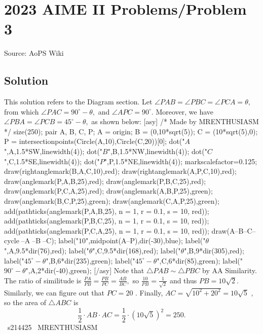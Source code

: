 \documentclass[12pt]{article}
\begin{document}
\section*{{2023 AIME II Problems/Problem 3}}
Source: AoPS Wiki

\subsection*{Solution}
This solution refers to the Diagram section. Let $\angle PAB = \angle PBC = \angle PCA = \theta,$ from which $\angle PAC = 90^\circ-\theta,$ and $\angle APC = 90^\circ.$ Moreover, we have $\angle PBA = \angle PCB = 45^\circ-\theta,$ as shown below: [asy] /* Made by MRENTHUSIASM */ size(250); pair A, B, C, P; A = origin; B = (0,10*sqrt(5)); C = (10*sqrt(5),0); P = intersectionpoints(Circle(A,10),Circle(C,20))[0]; dot("$A$",A,1.5*SW,linewidth(4)); dot("$B$",B,1.5*NW,linewidth(4)); dot("$C$",C,1.5*SE,linewidth(4)); dot("$P$",P,1.5*NE,linewidth(4)); markscalefactor=0.125; draw(rightanglemark(B,A,C,10),red); draw(rightanglemark(A,P,C,10),red); draw(anglemark(P,A,B,25),red); draw(anglemark(P,B,C,25),red); draw(anglemark(P,C,A,25),red); draw(anglemark(A,B,P,25),green); draw(anglemark(B,C,P,25),green); draw(anglemark(C,A,P,25),green); add(pathticks(anglemark(P,A,B,25), n = 1, r = 0.1, s = 10, red)); add(pathticks(anglemark(P,B,C,25), n = 1, r = 0.1, s = 10, red)); add(pathticks(anglemark(P,C,A,25), n = 1, r = 0.1, s = 10, red)); draw(A--B--C--cycle^^P--A^^P--B^^P--C); label("$10$",midpoint(A--P),dir(-30),blue); label("$\theta$",A,9.5*dir(76),red); label("$\theta$",C,9.5*dir(168),red); label("$\theta$",B,9*dir(305),red); label("$45^\circ-\theta$",B,6*dir(235),green); label("$45^\circ-\theta$",C,6*dir(85),green); label("$90^\circ-\theta$",A,2*dir(-40),green); [/asy] Note that $\triangle PAB \sim \triangle PBC$ by AA Similarity. The ratio of similitude is $\frac{PA}{PB} = \frac{PB}{PC} = \frac{AB}{BC},$ so $\frac{10}{PB} = \frac{1}{\sqrt2}$ and thus $PB=10\sqrt2.$ Similarly, we can figure out that $PC=20$ . Finally, $AC=\sqrt{10^2+20^2}=10\sqrt{5}$ , so the area of $\triangle ABC$ is \[\frac12\cdot AB\cdot AC = \frac12\cdot (10\sqrt{5})^2 = \boxed{250}.\] ~s214425 ~MRENTHUSIASM
\end{document}
